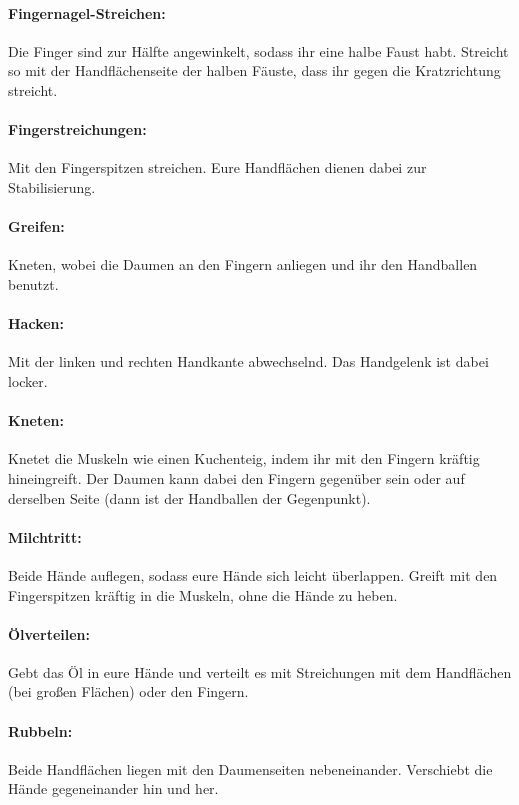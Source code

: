 \paragraph{Fingernagel-Streichen:} Die Finger sind zur Hälfte angewinkelt, sodass ihr eine halbe Faust habt. Streicht so mit der Handflächenseite der halben Fäuste, dass ihr gegen die Kratzrichtung streicht.

\paragraph{Fingerstreichungen:} Mit den Fingerspitzen streichen. Eure Handflächen dienen dabei zur Stabilisierung.

\paragraph{Greifen:} Kneten, wobei die Daumen an den Fingern anliegen und ihr den Handballen benutzt.

\paragraph{Hacken:} Mit der linken und rechten Handkante abwechselnd. Das Handgelenk ist dabei locker.

\paragraph{Kneten:} Knetet die Muskeln wie einen Kuchenteig, indem ihr mit den Fingern kräftig hineingreift. Der Daumen kann dabei den Fingern gegenüber sein oder auf derselben Seite (dann ist der Handballen der Gegenpunkt).

\paragraph{Milchtritt:} Beide Hände auflegen, sodass eure Hände sich leicht überlappen. Greift mit den Fingerspitzen kräftig in die Muskeln, ohne die Hände zu heben.

\paragraph{Ölverteilen:} Gebt das Öl in eure Hände und verteilt es mit Streichungen mit dem Handflächen (bei großen Flächen) oder den Fingern.

\paragraph{Rubbeln:} Beide Handflächen liegen mit den Daumenseiten nebeneinander. Verschiebt die Hände gegeneinander hin und her.

